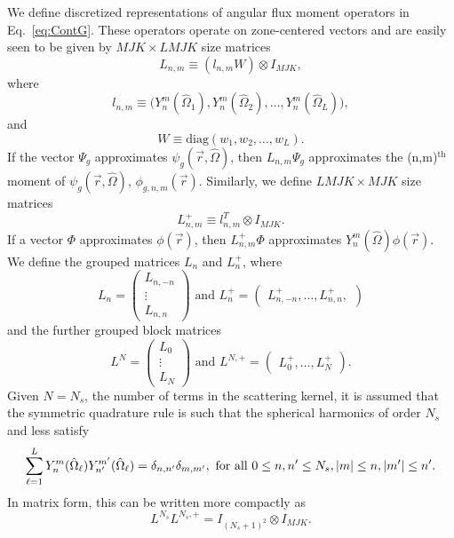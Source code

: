 We define discretized representations of angular flux moment operators in Eq.~\ref{eq:ContG}. These operators operate on zone-centered vectors and are easily seen to be given by $MJK \times LMJK$ size matrices
\begin{equation}
	L_{n,m} \equiv (l_{n,m}W) \otimes I_{MJK},
\end{equation}
where
\begin{equation}
	l_{n,m} \equiv \big (Y_{n}^{m}(\hat{\Omega}_{1}), Y_{n}^{m}(\hat{\Omega}_{2}), \dots, Y_{n}^{m}(\hat{\Omega}_{L}) \big ),
\end{equation}
and
\begin{equation}
	W \equiv \text{diag}(w_{1}, w_{2}, \dots, w_{L}).
\end{equation}
If the vector $\Psi_{g}$ approximates $\psi_{g}(\vec{r}, \hat{\Omega})$, then $L_{n,m} \Psi_{g}$ approximates the (n,m)$^{\text{th}}$ moment of $\psi_{g}(\vec{r},\hat{\Omega})$, $\phi_{g,n,m}(\vec{r})$. Similarly, we define $LMJK \times MJK$ size matrices
\begin{equation}
	L^{+}_{n,m} \equiv l^{T}_{n,m} \otimes I_{MJK}.
\end{equation} 
If a vector $\Phi$ approximates $\phi(\vec{r})$, then $L^{+}_{n,m} \Phi$ approximates $Y_{n}^{m}(\hat{\Omega}) \phi(\vec{r})$. We define the grouped matrices $L_{n}$ and $L^{+}_{n}$, where
\begin{equation}
	L_{n} = \begin{pmatrix}
			L_{n,-n} \\
			\vdots \\
			L_{n,n}
		    \end{pmatrix} \text{ and }
	L^{+}_{n} = \begin{pmatrix}
		    	L^{+}_{n,-n}, \dots, L^{+}_{n,n},
		    \end{pmatrix}
\end{equation}
and the further grouped block matrices
\begin{equation}
	L^{N} = \begin{pmatrix}
			L_{0} \\
			\vdots \\
			L_{N}
		    \end{pmatrix} \text{ and }
	L^{N,+} = \begin{pmatrix}
				L^{+}_{0}, \dots, L^{+}_{N}
			\end{pmatrix}.
\end{equation}
Given $N = N_{s}$, the number of terms in the scattering kernel, it is assumed that the symmetric quadrature rule is such that the spherical harmonics of order $N_{s}$ and less satisfy
\begin{equation}
	\sum_{\ell = 1}^{L} Y_{n}^{m}(\hat{\Omega}_{\ell}) Y_{n'}^{m'}(\hat{\Omega}_{\ell}) = \delta_{n,n'} \delta_{m,m'}, \text{ for all } 0 \leq n, n' \leq N_{s}, \lvert m\rvert \leq n, \lvert m'\rvert \leq n'.
\end{equation}
In matrix form, this can be written more compactly as
\begin{equation}
	L^{N_{s}} L^{N_{s},+} = I_{(N_{s}+1)^{2}} \otimes I_{MJK}.
\end{equation}

